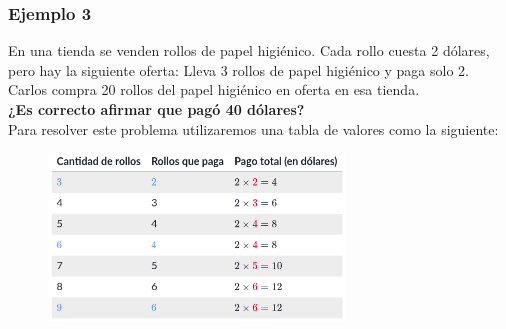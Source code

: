 \documentclass[11pt]{book}
\begin{document}
\subsubsection{Ejemplo 3}

En una tienda se venden rollos de papel higiénico. Cada rollo cuesta 2 dólares, pero hay la siguiente oferta:
Lleva 3 rollos de papel higiénico y paga solo 2.
Carlos compra 20 rollos del papel higiénico en oferta en esa tienda.\\
\textbf{¿Es correcto afirmar que pagó 40 dólares?}\\

Para resolver este problema utilizaremos una tabla de valores como la siguiente:




\begin{figure}[H]
  \centering
  \includegraphics[width=0.7\textwidth]{./Unidad 2/Images/tableS8L102.png}
\end{figure}
\end{document}
